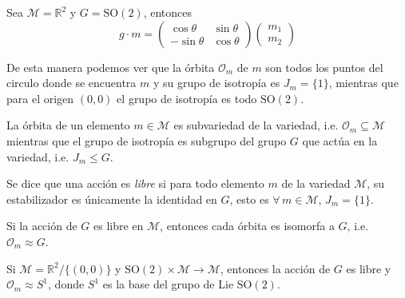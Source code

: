 \begin{ex}
Sea $\mathcal{M}=\mathbb{R}^{2}$ y $G=\mathrm{SO}(2)$, entonces
%
\begin{equation*}
g \cdot m =
\begin{pmatrix} \cos \theta & \sin \theta \\ -\sin \theta & \cos \theta \end{pmatrix}
\begin{pmatrix} m_{1} \\ m_{2} \end{pmatrix}
\end{equation*}

\begin{center}
\end{center}

De esta manera podemos ver que la \'{o}rbita $\mathcal{O}_{m}$ de $m$ son todos los puntos del circulo donde se encuentra $m$ y su grupo de isotrop\'{i}a es $J_{m} = \{1\}$, mientras que para el origen $(0,0)$ el grupo de isotrop\'{i}a es todo $\mathrm{SO}(2)$.
\end{ex}

\begin{obs}
La \'{o}rbita de un elemento $m \in \mathcal{M}$ es subvariedad de la variedad, i.e. $\mathcal{O}_{m} \subseteq \mathcal{M}$ mientras que el grupo de isotrop\'{i}a es subgrupo del grupo $G$ que act\'{u}a en la variedad, i.e. $J_{m} \leq G$.
\end{obs}

\begin{mydef}
Se dice que una acci\'{o}n es \emph{libre} si para todo elemento $m$ de la variedad $\mathcal{M}$, su estabilizador es \'{u}nicamente la identidad en $G$, esto es $\forall \, m \in \mathcal{M}$, $J_{m} = \{1\}$.
\end{mydef}

\begin{obs}
Si la acci\'{o}n de $G$ es libre en $\mathcal{M}$, entonces cada \'{o}rbita es isomorfa a $G$, i.e. $\mathcal{O}_{m} \approx G$.
%
\begin{ex}
Si $\mathcal{M} = \mathbb{R}^{2}/\{(0,0)\}$ y $\mathrm{SO}(2) \times \mathcal{M} \rightarrow \mathcal{M}$, entonces la acci\'{o}n de $G$ es libre y $\mathcal{O}_{m} \approx S^{1}$, donde $S^{1}$ es la base del grupo de Lie $\mathrm{SO}(2)$.
\end{ex}
\end{obs}
